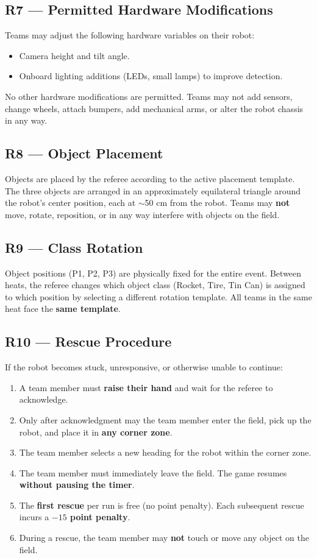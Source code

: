 \documentclass[a4]{article}
\begin{document}
\subsection*{R7 --- Permitted Hardware Modifications}
Teams may adjust the following hardware variables on their robot:
\begin{itemize}
    \item Camera height and tilt angle.
    \item Onboard lighting additions (LEDs, small lamps) to improve detection.
\end{itemize}
No other hardware modifications are permitted. Teams may not add sensors, change wheels, attach bumpers, add mechanical arms, or alter the robot chassis in any way.

\subsection*{R8 --- Object Placement}
Objects are placed by the referee according to the active placement template. The three objects are arranged in an approximately equilateral triangle around the robot's center position, each at $\sim$50 cm from the robot. Teams may \textbf{not} move, rotate, reposition, or in any way interfere with objects on the field.

\subsection*{R9 --- Class Rotation}
Object positions (P1, P2, P3) are physically fixed for the entire event. Between heats, the referee changes which object class (Rocket, Tire, Tin Can) is assigned to which position by selecting a different rotation template. All teams in the same heat face the \textbf{same template}.

\subsection*{R10 --- Rescue Procedure}
If the robot becomes stuck, unresponsive, or otherwise unable to continue:
\begin{enumerate}[label=\arabic*.]
    \item A team member must \textbf{raise their hand} and wait for the referee to acknowledge.
    \item Only after acknowledgment may the team member enter the field, pick up the robot, and place it in \textbf{any corner zone}.
    \item The team member selects a new heading for the robot within the corner zone.
    \item The team member must immediately leave the field. The game resumes \textbf{without pausing the timer}.
    \item The \textbf{first rescue} per run is free (no point penalty). Each subsequent rescue incurs a \textbf{$-15$ point penalty}.
    \item During a rescue, the team member may \textbf{not} touch or move any object on the field.
\end{enumerate}
\end{document}
